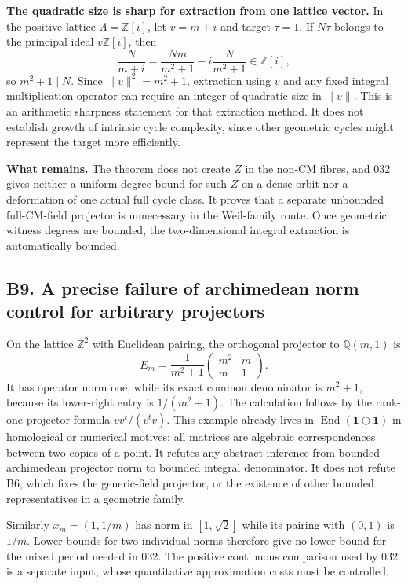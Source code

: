 \documentclass[11pt,a4paper]{article}
\theoremstyle{definition}
\begin{document}
\textbf{The quadratic size is sharp for extraction from one lattice vector.} In the positive lattice \(\Lambda=\mathbb Z[i]\), let \(v=m+i\) and target \(\tau=1\). If \(N\tau\) belongs to the principal ideal \(v\mathbb Z[i]\), then \[
 \frac{N}{m+i}=\frac{Nm}{m^2+1}-i\frac{N}{m^2+1}\in\mathbb Z[i],
\] so \(m^2+1\mid N\). Since \(\|v\|^2=m^2+1\), extraction using \(v\) and any fixed integral multiplication operator can require an integer of quadratic size in \(\|v\|\). This is an arithmetic sharpness statement for that extraction method. It does not establish growth of intrinsic cycle complexity, since other geometric cycles might represent the target more efficiently.

\textbf{What remains.} The theorem does not create \(Z\) in the non-CM fibres, and 032 gives neither a uniform degree bound for such \(Z\) on a dense orbit nor a deformation of one actual full cycle class. It proves that a separate unbounded full-CM-field projector is unnecessary in the Weil-family route. Once geometric witness degrees are bounded, the two-dimensional integral extraction is automatically bounded.

\subsection{B9. A precise failure of archimedean norm control for arbitrary projectors}\label{b9.-a-precise-failure-of-archimedean-norm-control-for-arbitrary-projectors}

On the lattice \(\mathbb Z^2\) with Euclidean pairing, the orthogonal projector to \(\mathbb Q(m,1)\) is \[
 E_m=\frac1{m^2+1}\begin{pmatrix}m^2&m\\m&1\end{pmatrix}.
\] It has operator norm one, while its exact common denominator is \(m^2+1\), because its lower-right entry is \(1/(m^2+1)\). The calculation follows by the rank-one projector formula \(vv^t/(v^tv)\). This example already lives in \(\operatorname{End}(\mathbf1\oplus\mathbf1)\) in homological or numerical motives: all matrices are algebraic correspondences between two copies of a point. It refutes any abstract inference from bounded archimedean projector norm to bounded integral denominator. It does not refute B6, which fixes the generic-field projector, or the existence of other bounded representatives in a geometric family.

Similarly \(x_m=(1,1/m)\) has norm in \([1,\sqrt2]\) while its pairing with \((0,1)\) is \(1/m\). Lower bounds for two individual norms therefore give no lower bound for the mixed period needed in 032. The positive continuous comparison used by 032 is a separate input, whose quantitative approximation costs must be controlled.
\end{document}
